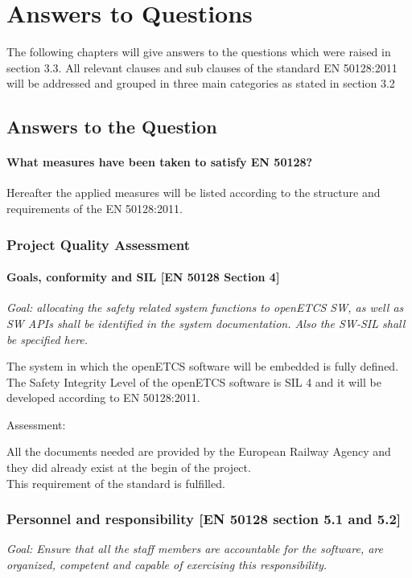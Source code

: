 \section{Answers to Questions}

The following chapters will give answers to the questions which were raised in section 3.3. All relevant clauses and sub clauses of the standard EN 50128:2011 will be addressed and grouped in three main categories as stated in section 3.2 

\subsection{Answers to the Question}
\bigskip
\paragraph{What measures have been taken to satisfy EN 50128?}
Hereafter the applied measures will be listed according to the structure and requirements of the EN 50128:2011.

\subsubsection{Project Quality Assessment}
\paragraph{Goals, conformity and SIL [EN 50128 Section 4]}

{\itshape
Goal: allocating the safety related system functions to openETCS SW, as well as SW APIs shall be identified in the system documentation. Also the SW-SIL shall be specified here. }

\bigskip
The system in which the openETCS software will be embedded is fully defined. The Safety Integrity Level of the openETCS software is SIL 4 and it will be developed according to EN 50128:2011.

\bigskip

Assessment:
\bigskip

All the documents needed are provided by the European Railway Agency and they did already exist at the begin of the project.\\
This requirement of the standard is fulfilled.

\bigskip

\bigskip

\subsubsection{Personnel and responsibility [EN 50128 section 5.1 and 5.2]}
\itshape{Goal: Ensure that all the staff members are accountable for the software, are organized, competent and capable of exercising this responsibility.}


